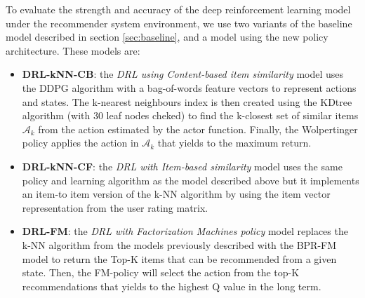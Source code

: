 To evaluate the strength and accuracy of the deep reinforcement learning model under the recommender system environment, we use two variants of the baseline model described in section \ref{sec:baseline}, and a model using the new policy architecture. These models are:

\begin{itemize}
\item \textbf{DRL-kNN-CB}: the \textit{DRL using Content-based item similarity} model uses the DDPG algorithm with a bag-of-words feature vectors to represent actions and states. The k-nearest neighbours index is then created using the KDtree algorithm \cite{friedman1977algorithm} (with 30 leaf nodes cheked) to find the k-closest set of similar items $\mathcal{A}_k$ from the action estimated by the actor function. Finally, the Wolpertinger policy applies the action in $\mathcal{A}_k$ that yields to the maximum return.
\item \textbf{DRL-kNN-CF}: the \textit{DRL with Item-based similarity} model uses the same policy and learning algorithm as the model described above but it implements an item-to item version of the k-NN algorithm by using the item vector representation from the user rating matrix.
\item \textbf{DRL-FM}: the \textit{DRL with Factorization Machines policy} model replaces the k-NN algorithm from the models previously described with the BPR-FM model to return the Top-K items that can be recommended from a given state. Then, the FM-policy will select the action from the top-K recommendations that yields to the highest Q value in the long term.
\end{itemize}
%


